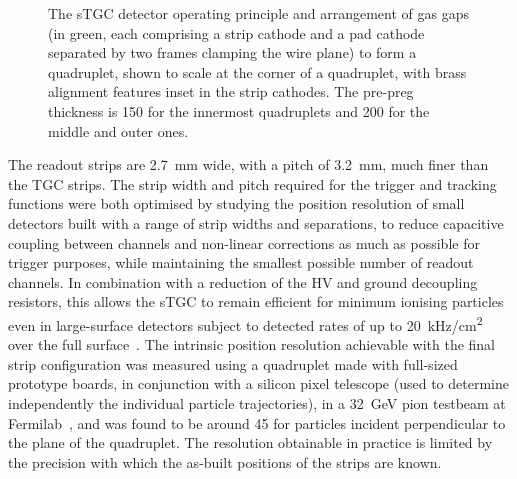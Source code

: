 \documentclass[cernpreprint, atlasdraft=false, UKenglish,british,orcidlogo, texmf, orcidlogo]{atlasdoc}
\begin{document}
\begin{figure}[!h]
\hfil
{}
\caption[\gls{sTGC} detector operating principle]{The \gls{sTGC} \protect{} detector operating principle and \protect{} arrangement of gas gaps (in green, each comprising a strip cathode and a pad cathode separated by two frames clamping the wire plane) to form a quadruplet, shown to scale at the corner of a quadruplet, with brass alignment features inset in the strip cathodes. The pre-preg thickness is \SI{150}{\micron} for the innermost quadruplets and \SI{200}{\micron} for the middle and outer ones.
\label{fig:Muon_sTGCprinciple}}
\end{figure}
 
The readout strips are \SI{2.7}{\mm} wide, with a pitch of \SI{3.2}{\mm}, much finer than the \gls{TGC} strips.
The strip width and pitch required for the trigger and tracking functions were both optimised
by studying the position resolution of small detectors built with a range of strip widths and separations,
to reduce capacitive coupling between channels and non-linear corrections as much as possible for trigger purposes,
while maintaining the smallest possible number of readout channels.
In combination with a reduction of the HV and ground
decoupling resistors, this allows the \gls{sTGC} to remain efficient for minimum ionising particles even in large-surface detectors subject to detected rates of up to \SI{20}{\kHz/\cm\squared} over the full surface~\cite{ATLAS-TDR-20}.
The intrinsic position resolution achievable with the final strip configuration was measured using a quadruplet made with full-sized prototype boards, in conjunction with a silicon pixel telescope (used to determine independently the individual particle trajectories), in a \SI{32}{\GeV} pion testbeam at Fermilab~\cite{ABUSLEME201685}, and was found to be around \SI{45}{\micron} for particles incident perpendicular to the plane of the quadruplet.
The resolution obtainable in practice is limited by the precision with which the as-built positions of the strips are known.
 
 
\end{document}
